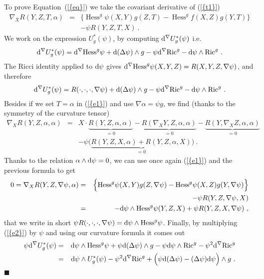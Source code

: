 \documentclass[a4paper,11pt,leqno]{amsart}
\numberwithin{equation}{section}
\theoremstyle{main}
\begin{document}
\proof To prove Equation~({\ref{{eq}}}) we take the covariant derivative of ({\ref{{t1}}}) 
\begin{eqnarray}\label{e1}
	\nabla_X R(Y,Z,T,\alpha) &=&  \Big\{ {\operatorname{Hess}}^g \psi(X,Y)g(Z,T) - {\operatorname{Hess}}^g f(X,Z)g(Y,T) \Big\} \\
\nonumber	&&  -\psi R(Y,Z,T,X) \ .
\end{eqnarray}
We work on the expression $U_g^* (\psi)$, by computing ${{\rm d}} ^\nabla U_g^* (\psi)$ i.e.
\begin{equation*}
	{{\rm d}} ^\nabla U_g^* (\psi)=  {{\rm d}} ^\nabla {\operatorname{Hess}}^g \psi + {{\rm d}} (\Delta \psi) \wedge g -\psi {{\rm d}} ^\nabla{\operatorname{Ric}}^g - {{\rm d}} \psi \wedge {\operatorname{Ric}}^g \ .
\end{equation*}
The Ricci identity applied to ${{\rm d}} \psi$ gives ${{\rm d}} ^\nabla {\operatorname{Hess}}^g \psi(X,Y,Z)= R(X,Y,Z,\nabla \psi)$, and therefore
\begin{equation}\label{e2}
	 {{\rm d}} ^\nabla U_g^* (\psi)= R(\cdot,\cdot,\cdot, \nabla \psi)  + {{\rm d}} (\Delta \psi) \wedge g -\psi {{\rm d}} ^\nabla{\operatorname{Ric}}^g - {{\rm d}} \psi \wedge {\operatorname{Ric}}^g \ .
\end{equation}
Besides if we set $T=\alpha$ in ({\ref{{e1}}}) and use $ \nabla \alpha  =\psi g $, we find (thanks to the symmetry of the curvature tensor)
\begin{eqnarray*}
		\nabla_X R(Y,Z,\alpha,\alpha)&=& X\cdot \underbrace{R(Y,Z,\alpha,\alpha)}_{=0} - \underbrace{R(\nabla_X Y,Z,\alpha,\alpha)}_{=0} - \underbrace{R(Y,\nabla_X Z,\alpha,\alpha)}_{=0}\\
		&& -\psi \big( \underbrace{R(Y,Z,X,\alpha) +  R(Y,Z,\alpha, X)}_{=0}\big) \ .
\end{eqnarray*}
Thanks to the relation $\alpha \wedge {{\rm d}} \psi=0$, we can use once again ({\ref{{e1}}}) and the previous formula to get
\begin{eqnarray*}
	0=\nabla_X R(Y,Z,\nabla \psi,\alpha)&=&   \Big\{ {\operatorname{Hess}}^g \psi(X,Y)g(Z,\nabla \psi) - {\operatorname{Hess}}^g \psi(X,Z)g(Y,\nabla \psi) \Big\} \\
	&&  -\psi R(Y,Z,\nabla \psi,X)\\
	&=& - {{\rm d}} \psi \wedge {\operatorname{Hess}}^g \psi (Y,Z,X) +\psi R(Y,Z,X,\nabla \psi) \ ,
\end{eqnarray*}
that we write in short $\psi R(\cdot,\cdot,\cdot,\nabla \psi)= {{\rm d}} \psi \wedge {\operatorname{Hess}}^g \psi $. Finally, by multiplying ({\ref{{e2}}}) by $\psi$ and using our curvature formula it comes out
\begin{eqnarray*}
	\psi{{\rm d}} ^\nabla U_g^* (\psi) &=&  {{\rm d}} \psi \wedge {\operatorname{Hess}}^g \psi + \psi {{\rm d}} (\Delta \psi) \wedge g - \psi {{\rm d}} \psi \wedge {\operatorname{Ric}}^g -\psi^2 {{\rm d}} ^\nabla{\operatorname{Ric}}^g \\
	&=& {{\rm d}} \psi \wedge U_g^*(\psi) -\psi^2 {{\rm d}} ^\nabla{\operatorname{Ric}}^g +\Big( \psi{{\rm d}} (\Delta \psi) - (\Delta \psi) {{\rm d}} \psi\Big)\wedge g \ . 
\end{eqnarray*}
{\hfill $\blacksquare$ \medskip \\}
\end{document}
